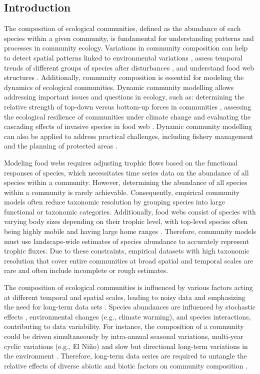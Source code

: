 \documentclass[a4paper,twoside,12pt]{article}
\begin{document}
\subsection*{Introduction}
 The composition of ecological communities, defined as the abundance of each species within a given community, is fundamental for understanding patterns and processes in community ecology. Variations in community composition can help to detect spatial patterns linked to environmental variations \citep{kemp1990}, assess temporal trends of different groups of species after disturbances \citep{philippi1998, magurran2007}, and understand food web structures \citep{cohen2003}. Additionally, community composition is essential for modeling the dynamics of ecological communities. Dynamic community modelling allows addressing important issues and questions in ecology, such as: determining the relative strength of top-down versus bottom-up forces in communities \citep{krebs2003,legagneux2014}, assessing the ecological resilience of communities under climate change \citep{griffith2019} and evaluating the cascading effects of invasive species in food web \citep{david2017, goto2020}. Dynamic community modelling can also be applied to address practical challenges, including fishery management \citep{plaganyi2007} and the planning of protected areas \citep{okey2004, dahood2020}. 
 
Modeling food webs requires adjusting trophic flows based on the functional responses of species, which necessitates time series data on the abundance of all species within a community. However, determining the abundance of all species within a community is rarely achievable. Consequently, empirical community models often reduce taxonomic resolution by grouping species into large functional or taxonomic categories. Additionally, food webs consist of species with varying body sizes depending on their trophic level, with top-level species often being highly mobile and having large home ranges \citep{mccann2005}. Therefore, community models must use landscape-wide estimates of species abundance to accurately represent trophic fluxes. Due to these constraints, empirical datasets with high taxonomic resolution that cover entire communities at broad spatial and temporal scales are rare and often include incomplete or rough estimates.

The composition of ecological communities is influenced by various factors acting at different temporal and spatial scales, leading to noisy data and emphasizing the need for long-term data sets \citep{magurran2010, lindenmayer2012}. Species abundances are influenced by stochastic effects \citep{hubbell2001}, environmental changes (e.g., climate warming), and species interactions, contributing to data variability. For instance, the composition of a community could be driven simultaneously by intra-annual seasonal variations, multi-year cyclic variations (e.g., El Niño) and slow but directional long-term variations in the environment \citep{brown1990, snyder2006}. Therefore, long-term data series are required to untangle the relative effects of diverse abiotic and biotic factors on community composition \citep{magurran2010, lindenmayer2012}.
\end{document}
